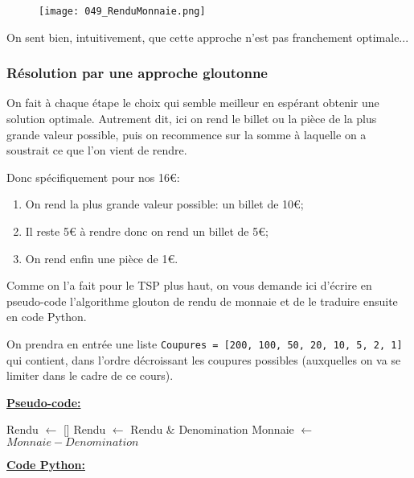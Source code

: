 \documentclass[12pt]{article}
\begin{document}
	\begin{figure}[H]
		\centering
		\texttt{[image: 049\_RenduMonnaie.png]}
	\end{figure}
	
	On sent bien, intuitivement, que cette approche n'est pas franchement optimale...
	
	\subsubsection*{Résolution par une approche gloutonne}
	\begin{MaReponse}
		On fait à chaque étape le choix qui semble meilleur en espérant obtenir une solution optimale. Autrement dit, ici on rend le billet ou la pièce de la plus grande valeur possible, puis on recommence sur la somme à laquelle on a soustrait ce que l'on vient de rendre.
		
		Donc spécifiquement pour nos 16\euro{}:
		\begin{enumerate}
			\item On rend la plus grande valeur possible: un billet de 10\euro{};
			\item Il reste 5\euro{} à rendre donc on rend un billet de 5\euro{};
			\item On rend enfin une pièce de 1\euro{}.
		\end{enumerate}
	\end{MaReponse}
	
	\begin{MonExo}
		Comme on l'a fait pour le TSP plus haut, on vous demande ici d'écrire en pseudo-code l'algorithme glouton de rendu de monnaie et de le traduire ensuite en code Python.
		
		On prendra en entrée une liste \texttt{Coupures = [200, 100, 50, 20, 10, 5, 2, 1]} qui contient, dans l'ordre décroissant les coupures possibles (auxquelles on va se limiter dans le cadre de ce cours).
	\end{MonExo}
	\begin{MaReponse}
		\textbf{\uline{Pseudo-code:}}
		\begin{algorithmic}[1]
			\State Rendu $\leftarrow$ []
			\State Rendu $\leftarrow$ Rendu \& Denomination
			\State Monnaie $\leftarrow$ $Monnaie - Denomination$
			\EndWhile
			\EndFor
			\State{}
			\EndFunction
		\end{algorithmic}
		\textbf{\uline{Code Python:}}
	\end{MaReponse}
	
\end{document}
